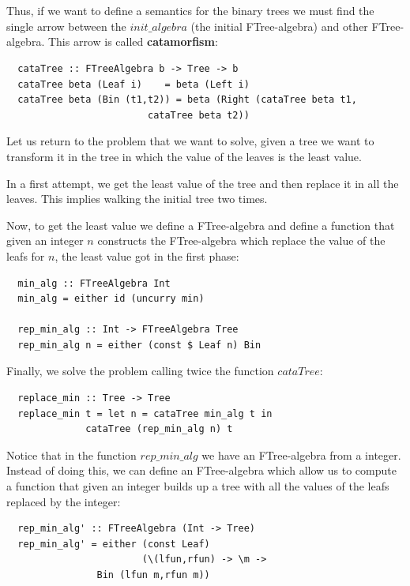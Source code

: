 \documentclass[a4paper,10pt]{article}
\begin{document}
\

\

Thus, if we want to define a semantics for the binary trees we must find the single arrow
between the $init\_algebra$ (the initial FTree-algebra) and other FTree-algebra. This arrow
is called \textbf{catamorfism}:

\begin{lstlisting}
  cataTree :: FTreeAlgebra b -> Tree -> b
  cataTree beta (Leaf i)    = beta (Left i)
  cataTree beta (Bin (t1,t2)) = beta (Right (cataTree beta t1,
					     cataTree beta t2))
\end{lstlisting}

Let us return to the problem that we want to solve, given a tree we want to transform it
in the tree in which the value of the leaves is the least value.

In a first attempt, we get the least value of the tree and then replace it in
all the leaves. This implies walking the initial tree two times.

Now, to get the least value we define a FTree-algebra and define a function that
given an integer $n$ constructs the FTree-algebra which replace the value of the leafs
for $n$, the least value got in the first phase:

\begin{lstlisting}
  min_alg :: FTreeAlgebra Int
  min_alg = either id (uncurry min)

  rep_min_alg :: Int -> FTreeAlgebra Tree
  rep_min_alg n = either (const $ Leaf n) Bin
\end{lstlisting}

Finally, we solve the problem calling twice the function $cataTree$:

\begin{lstlisting}
  replace_min :: Tree -> Tree
  replace_min t = let n = cataTree min_alg t in
		      cataTree (rep_min_alg n) t
\end{lstlisting}

Notice that in the function $rep\_min\_alg$ we have an FTree-algebra from a integer.
Instead of doing this, we can define an FTree-algebra which allow us to compute a
function that given an integer builds up a tree with all the values of the leafs
replaced by the integer:

\begin{lstlisting}
  rep_min_alg' :: FTreeAlgebra (Int -> Tree)
  rep_min_alg' = either (const Leaf) 
                        (\(lfun,rfun) -> \m -> 
			    Bin (lfun m,rfun m))
\end{lstlisting}
\end{document}
